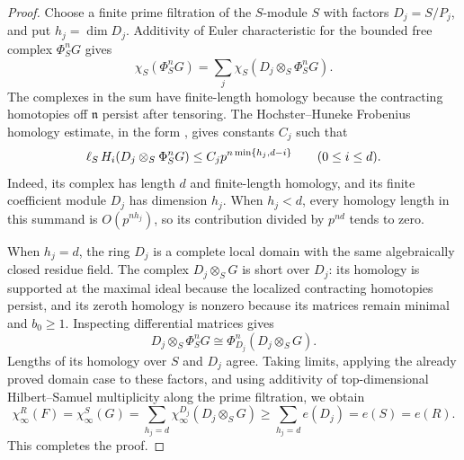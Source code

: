 \begin{proof}
Choose a finite prime filtration of the $S$-module $S$ with factors
$D_j=S/P_j$, and put $h_j=\dim D_j$.  Additivity of Euler
characteristic for the bounded free complex $\Phi_S^nG$ gives
\[
 \chi_S(\Phi_S^nG)
       =\sum_j\chi_S(D_j\otimes_S\Phi_S^nG).
\]
The complexes in the sum have finite-length homology because the
contracting homotopies off $\mathfrak n$ persist after tensoring.
The Hochster--Huneke Frobenius homology estimate, in the form
\cite[Theorem~5.2]{BhattHochsterMa}, gives constants $C_j$ such that
\[
 \operatorname{\ell}_S H_i(D_j\otimes_S\Phi_S^nG)
       \leq C_jp^{n\min\{h_j,d-i\}}
       \qquad(0\leq i\leq d).
\]
Indeed, its complex has length $d$ and finite-length homology, and
its finite coefficient module $D_j$ has dimension $h_j$.
When $h_j<d$, every homology length in this summand is
$O(p^{nh_j})$, so its contribution divided by $p^{nd}$ tends to
zero.

When $h_j=d$, the ring $D_j$ is a complete local domain with the
same algebraically closed residue field.  The complex
$D_j\otimes_SG$ is short over $D_j$: its homology is supported at
the maximal ideal because the localized contracting homotopies
persist, and its zeroth homology is nonzero because its matrices
remain minimal and $b_0\geq1$.  Inspecting differential matrices
gives
\[
 D_j\otimes_S\Phi_S^nG
       \cong\Phi_{D_j}^n(D_j\otimes_SG).
\]
Lengths of its homology over $S$ and $D_j$ agree.  Taking limits,
applying the already proved domain case to these factors, and using
additivity of top-dimensional Hilbert--Samuel multiplicity along the
prime filtration, we obtain
\[
 \chi_\infty^R(F)=\chi_\infty^S(G)
   =\sum_{h_j=d}\chi_\infty^{D_j}(D_j\otimes_SG)
   \geq\sum_{h_j=d}e(D_j)=e(S)=e(R).
\]
This completes the proof.
\end{proof}
